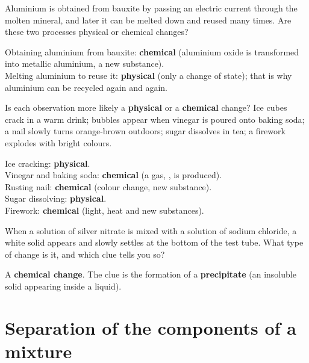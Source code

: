 \begin{exercise}
    Aluminium is obtained from bauxite by passing an electric current through the molten mineral, and later it can be melted down and reused many times. Are these two processes physical or chemical changes?
    \begin{solu}
        Obtaining aluminium from bauxite: \textbf{chemical} (aluminium oxide is transformed into metallic aluminium, a new substance). \\
        Melting aluminium to reuse it: \textbf{physical} (only a change of state); that is why aluminium can be recycled again and again.
    \end{solu}
\end{exercise}

\begin{exercise}
    Is each observation more likely a \textbf{physical} or a \textbf{chemical} change? Ice cubes crack in a warm drink; bubbles appear when vinegar is poured onto baking soda; a nail slowly turns orange-brown outdoors; sugar dissolves in tea; a firework explodes with bright colours.
    \begin{solu}
        Ice cracking: \textbf{physical}. \\
        Vinegar and baking soda: \textbf{chemical} (a gas, , is produced). \\
        Rusting nail: \textbf{chemical} (colour change, new substance). \\
        Sugar dissolving: \textbf{physical}. \\
        Firework: \textbf{chemical} (light, heat and new substances).
    \end{solu}
\end{exercise}

\begin{exercise}
    When a solution of silver nitrate is mixed with a solution of sodium chloride, a white solid appears and slowly settles at the bottom of the test tube. What type of change is it, and which clue tells you so?
    \begin{solu}
        A \textbf{chemical change}. The clue is the formation of a \textbf{precipitate} (an insoluble solid appearing inside a liquid).
    \end{solu}
\end{exercise}


\section{Separation of the components of a mixture}

